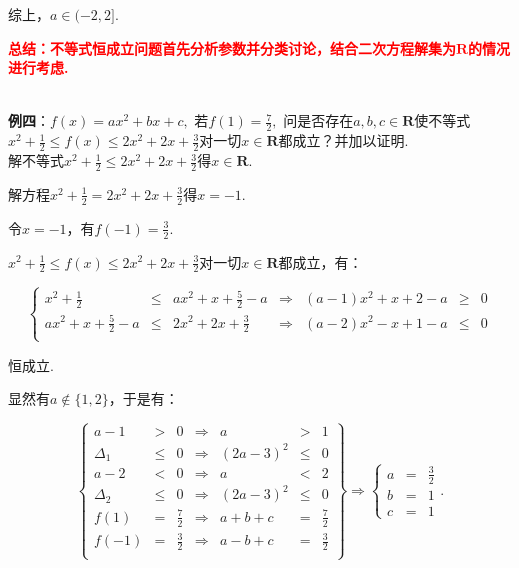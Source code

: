 \documentclass[8pt]{article}
\begin{document}
					综上，$a\in(-2, 2]$.

					\textcolor{red}{\textbf{总结：不等式恒成立问题首先分析参数并分类讨论，结合二次方程解集为$\mathbf{R}$的情况进行考虑.}}

				~\\

				\textbf{例四}：$f(x)=ax^2+bx+c,$ 若$\displaystyle f(1)=\frac{7}{2},$ 问是否存在$a, b, c\in \mathbf{R}$使不等式$\displaystyle x^2+\frac{1}{2}\leq f(x)\leq 2x^2+2x+\frac{3}{2}$对一切$x\in \mathbf{R}$都成立？并加以证明.
					~\\

					解不等式$\displaystyle x^2+\frac{1}{2}\leq 2x^2+2x+\frac{3}{2}$得$x\in \mathbf{R}.$

					解方程$\displaystyle x^2+\frac{1}{2}= 2x^2+2x+\frac{3}{2}$得$x=-1.$

					令$x=-1$，有$f(-1)=\frac{3}{2}.$

					$\displaystyle x^2+\frac{1}{2}\leq f(x)\leq 2x^2+2x+\frac{3}{2}$对一切$x\in \mathbf{R}$都成立，有：

					$$
					\left\{
					\begin{array}{rclcrcl}
					\displaystyle x^2+\frac{1}{2}&\leq&ax^2+x+\frac{5}{2}-a&\Rightarrow&(a-1)x^2+x+2-a&\geq&0\\
					\displaystyle ax^2+x+\frac{5}{2}-a&\leq&2x^2+2x+\frac{3}{2}&\Rightarrow&(a-2)x^2-x+1-a&\leq&0\\
					\end{array}
					\right.
					$$

					恒成立.

					显然有$a\notin \{1, 2\}$，于是有：

					$$
					\displaystyle
					\left\{
					\begin{array}{rclcrcl}
					a-1&>&0&\Rightarrow&a&>&1\\
					\Delta_1&\leq&0&\Rightarrow&(2a-3)^2&\leq&0\\
					a-2&<&0&\Rightarrow&a&<&2\\
					\Delta_2&\leq&0&\Rightarrow&(2a-3)^2&\leq&0\\
					f(1)&=&\frac{7}{2}&\Rightarrow&a+b+c&=&\frac{7}{2}\\
					f(-1)&=&\frac{3}{2}&\Rightarrow&a-b+c&=&\frac{3}{2}\\
					\end{array}
					\right\}
					\Rightarrow
					\left\{
					\begin{array}{rcl}
					a&=&\frac{3}{2}\\
					b&=&1\\
					c&=&1
					\end{array}
					\right..
					$$
\end{document}
